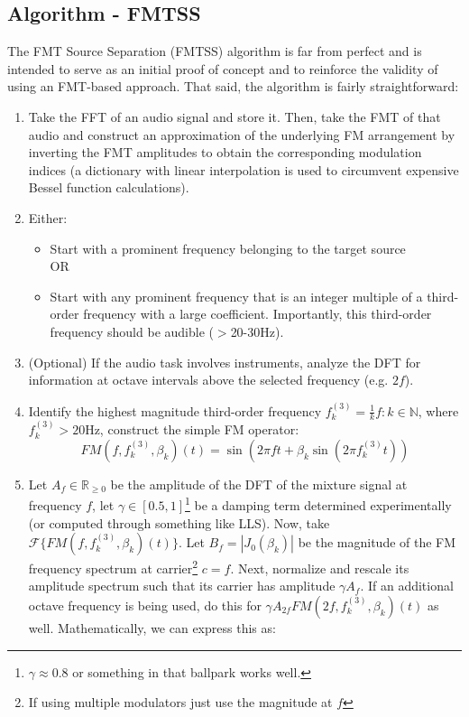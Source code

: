 \documentclass[11pt,twoside]{report}
\numberwithin{thm}{section}
\numberwithin{equation}{section}
\newcommand{\N}{{\mathbb{N}}}
\begin{document}
\subsection{Algorithm - FMTSS}
The FMT Source Separation (FMTSS) algorithm is far from perfect and is intended to serve as an initial proof of concept and to reinforce the validity of using an FMT-based approach. That said, the algorithm is fairly straightforward:
\begin{enumerate}
    \item Take the FFT of an audio signal and store it. Then, take the FMT of that audio and construct an approximation of the underlying FM arrangement by inverting the FMT amplitudes to obtain the corresponding modulation indices (a dictionary with linear interpolation is used to circumvent expensive Bessel function calculations). 
    \item Either:
    \begin{itemize}
        \item Start with a prominent frequency belonging to the target source \\
        OR
        \item Start with any prominent frequency that is an integer multiple of a third-order frequency with a large coefficient. Importantly, this third-order frequency should be audible ($>$20-30Hz). 
    \end{itemize}
    \item (Optional) If the audio task involves instruments, analyze the DFT for information at octave intervals above the selected frequency (e.g. $2f$). 
    \item Identify the highest magnitude third-order frequency $f_k^{(3)} = \frac{1}{k}f : k \in \N$, where $f_k^{(3)} > 20$Hz, construct the simple FM operator: 
    \begin{equation}
      FM(f,f_k^{(3)}, \beta_k )(t) = \sin(2\pi f t+\beta_k\sin(2\pi f_k^{(3)}t))  
    \end{equation}
    \item Let $A_f \in \mathbb{R}_{\geq 0}$ be the amplitude of the DFT of the mixture signal at frequency $f$, let $\gamma \in [0.5, 1]$\footnote{$\gamma \approx 0.8$ or something in that ballpark works well.} be a damping term determined experimentally (or computed through something like LLS). Now, take $\mathcal{F}\{FM(f,f_k^{(3)}, \beta_k )(t)\}$. Let $B_f = |J_0(\beta_k)|$  be the magnitude of the FM frequency spectrum at carrier\footnote{If using multiple modulators just use the magnitude at $f$} $c =f$. Next, normalize and rescale its amplitude spectrum such that its carrier has amplitude $\gamma A_f$. If an additional octave frequency is being used, do this for $\gamma A_{2f}FM(2f,f_k^{(3)}, \beta_k )(t)$ as well. Mathematically, we can express this as:

\end{enumerate}
\end{document}

